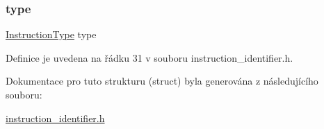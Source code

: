 \subsubsection{\texorpdfstring{type}{type}}
{\footnotesize\ttfamily \hyperlink{instruction__identifier_8h_a0fd169cab2a2c0d1bcd094d69ccc98e7}{Instruction\+Type} type}



Definice je uvedena na řádku 31 v souboru instruction\+\_\+identifier.\+h.



Dokumentace pro tuto strukturu (struct) byla generována z následujícího souboru\+:\begin{DoxyCompactItemize}
\item 
\hyperlink{instruction__identifier_8h}{instruction\+\_\+identifier.\+h}\end{DoxyCompactItemize}
